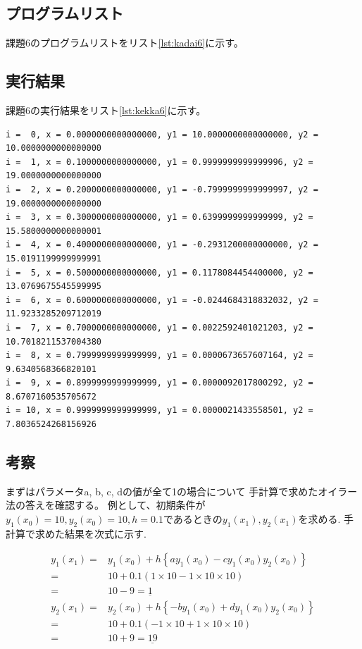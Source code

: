 \documentclass[a4j,titlepage]{jsarticle}
\begin{document}
\subsection{プログラムリスト}
課題6のプログラムリストをリスト\ref{lst:kadai6}に示す。



\subsection{実行結果}
課題6の実行結果をリスト\ref{lst:kekka6}に示す。

\begin{lstlisting}[style=text,caption=課題6の実行結果,label=lst:kekka6]
i =  0, x = 0.0000000000000000, y1 = 10.0000000000000000, y2 = 10.0000000000000000
i =  1, x = 0.1000000000000000, y1 = 0.9999999999999996, y2 = 19.0000000000000000
i =  2, x = 0.2000000000000000, y1 = -0.7999999999999997, y2 = 19.0000000000000000
i =  3, x = 0.3000000000000000, y1 = 0.6399999999999999, y2 = 15.5800000000000001
i =  4, x = 0.4000000000000000, y1 = -0.2931200000000000, y2 = 15.0191199999999991
i =  5, x = 0.5000000000000000, y1 = 0.1178084454400000, y2 = 13.0769675545599995
i =  6, x = 0.6000000000000000, y1 = -0.0244684318832032, y2 = 11.9233285209712019
i =  7, x = 0.7000000000000000, y1 = 0.0022592401021203, y2 = 10.7018211537004380
i =  8, x = 0.7999999999999999, y1 = 0.0000673657607164, y2 = 9.6340568366820101
i =  9, x = 0.8999999999999999, y1 = 0.0000092017800292, y2 = 8.6707160535705672
i = 10, x = 0.9999999999999999, y1 = 0.0000021433558501, y2 = 7.8036524268156926
\end{lstlisting}

\subsection{考察}
まずはパラメータa, b, c, dの値が全て1の場合について
手計算で求めたオイラー法の答えを確認する。
例として、初期条件が$y_1(x_0)=10,y_2(x_0)=10,h=0.1$であるときの$y_1(x_1),y_2(x_1)$を求める.
手計算で求めた結果を次式に示す.

\begin{equation}
\begin{split}
y_1(x_1)=&y_1(x_0)+ h\left\{ ay_{1}\left( x_{0}\right) -cy_{1}\left( x_{0}\right) y_{2}\left( x_{0}\right) \right\} \\
        =&10+0.1(1\times10-1\times10\times10)\\
        =&10-9=\underline{1}\\
y_2(x_1)=&y_2(x_0)+ h\left\{ -by_{1}\left( x_{0}\right) +dy_{1}\left( x_{0}\right) y_{2}\left( x_{0}\right) \right\} \\
=&10+0.1(-1\times10+1\times10\times10)\\
=&10+9=\underline{19}      
\end{split}
\end{equation}
\end{document}

